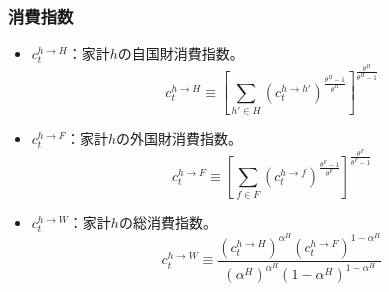 \subsubsection*{消費指数}
\label{sec:chapter3_definitions_variables_endogenous_consumption_indices}
\begin{itemize}
    \item
    \label{itm:chapter3_definitions_variables_endogenous_consumption_indices_c_h_H}
        \(c_t^{h\to H}\)：家計\(h\)の自国財消費指数。
        \begin{equation}
        \label{form:chapter3_definitions_variables_endogenous_consumption_indices_c_h_H_def}
            c_t^{h\to H}\equiv\left[\sum_{h'\in H}(c_t^{h\to h'})^{\frac{\theta^H-1}{\theta^H}}\right]^{\frac{\theta^H}{\theta^H-1}}
        \end{equation}
    \item
    \label{itm:chapter3_definitions_variables_endogenous_consumption_indices_c_h_F} \(c_t^{h\to F}\)：家計\(h\)の外国財消費指数。
        \begin{equation}
        \label{form:chapter3_definitions_variables_endogenous_consumption_indices_c_h_F_def}
            c_t^{h\to F}\equiv\left[\sum_{f\in F}(c_t^{h\to f})^{\frac{\theta^F-1}{\theta^F}}\right]^{\frac{\theta^F}{\theta^F-1}}
        \end{equation}
    \item
    \label{itm:chapter3_definitions_variables_endogenous_consumption_indices_c_h_W}
        \(c_t^{h\to W}\)：家計\(h\)の総消費指数。
        \begin{equation}
        \label{form:chapter3_definitions_variables_endogenous_consumption_indices_c_h_W_def}
            c_t^{h\to W}\equiv\frac{(c_t^{h\to H})^{\alpha^H}(c_t^{h\to F})^{1-\alpha^H}}{(\alpha^H)^{\alpha^H}(1-\alpha^H)^{1-\alpha^H}}
        \end{equation}
\end{itemize}
